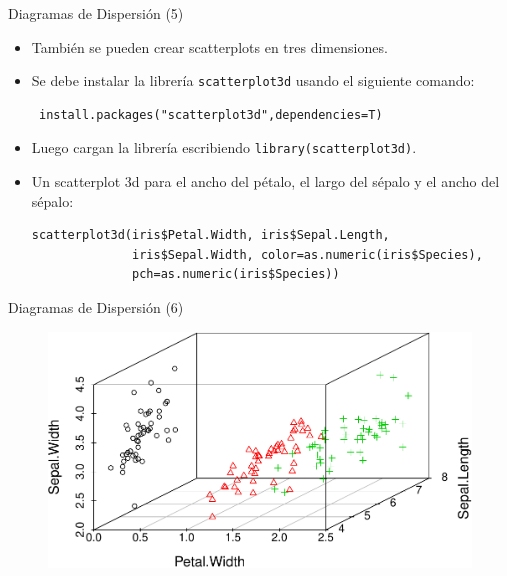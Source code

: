 \documentclass[handout]{beamer}
\begin{document}
\begin{frame}[fragile]{Diagramas de Dispersión (5)}
\scriptsize{
\begin{itemize}
 \item También se pueden crear scatterplots en tres dimensiones.
 \item Se debe instalar la librería \verb+scatterplot3d+ usando el siguiente comando:
 
 \begin{verbatim}
 install.packages("scatterplot3d",dependencies=T)
 \end{verbatim}
 
 \item Luego cargan la librería escribiendo \verb+library(scatterplot3d)+.
 
 \item Un scatterplot 3d para el ancho del pétalo, el largo del sépalo y el ancho del sépalo:
 \begin{verbatim}
scatterplot3d(iris$Petal.Width, iris$Sepal.Length, 
              iris$Sepal.Width, color=as.numeric(iris$Species),
              pch=as.numeric(iris$Species))  
 \end{verbatim}

 
  
\end{itemize}




}
 
\end{frame}


\begin{frame}[fragile]{Diagramas de Dispersión (6)}

 
 
  \begin{figure}[h!]
	\centering
	\includegraphics[scale=0.6]{imagenes/scatter3.pdf}		
\end{figure} 
 
 

 
\end{frame}
\end{document}
